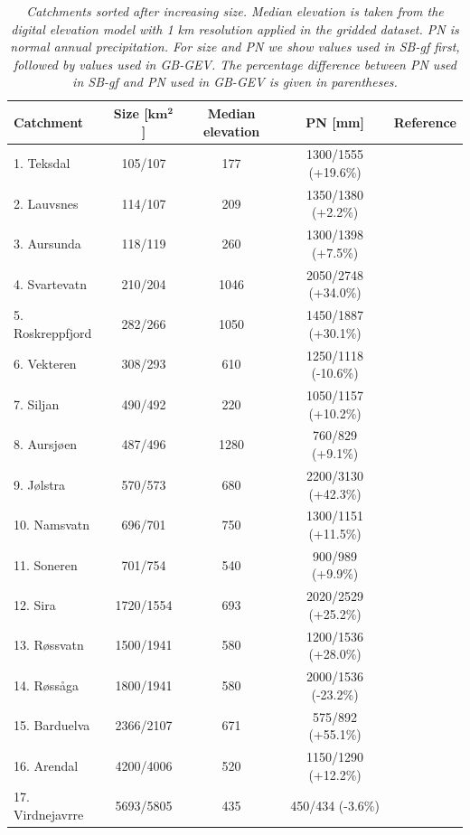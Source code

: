 \documentclass[12pt,a4paper,english]{article}
\begin{document}
\begin{table}[hbtp]
  \begin{tabular}{|l|c|c|c|c|}
    \hline
    \hline
    \textbf{Catchment} & \textbf{Size [$\mathbf{km^2}$] } & \textbf{Median elevation} & \textbf{PN [mm]} & \textbf{Reference} \\
	\hline
	1. Teksdal & 105/107 & 177 & 1300/1555 (+19.6\%) & \cite{Forland1997}\\
	\hline
	2. Lauvsnes & 114/107 & 209 & 1350/1380 (+2.2\%) & \cite{Isaksen2006}\\
	\hline
	3. Aursunda & 118/119 & 260 & 1300/1398 (+7.5\%) & \cite{Mamen2009}\\
	\hline
	4. Svartevatn & 210/204 & 1046 & 2050/2748 (+34.0\%) & \cite{Forland1991b} \\
	\hline
	5. Roskreppfjord & 282/266 & 1050 & 1450/1887 (+30.1\%) & \cite{Forland1991b}\\
	\hline
	6. Vekteren & 308/293 & 610 & 1250/1118 (-10.6\%) & \cite{Forland1991a}\\
	\hline
	7. Siljan & 490/492 & 220 & 1050/1157 (+10.2\%) & \cite{Forland1986b}\\
	\hline
	8. Aursj{\o}en & 487/496 & 1280 & 760/829 (+9.1\%) & \cite{Hanssen-Bauer1992}\\
	\hline
	9. J{\o}lstra & 570/573 & 680 & 2200/3130 (+42.3\%) & \cite{Forland1986a}\\
	\hline
	10. Namsvatn & 696/701 & 750 & 1300/1151 (+11.5\%) & \cite{Forland1991a}\\
	\hline
	11. Soneren & 701/754 & 540 & 900/989 (+9.9\%) & \cite{Hanssen-Bauer1991}\\
	\hline
	12. Sira & 1720/1554 & 693 & 2020/2529 (+25.2\%) & \cite{Forland1991b}\\
	\hline
	13. R{\o}ssvatn & 1500/1941 & 580 & 1200/1536 (+28.0\%) & \cite{Forland1988} \\
	\hline
	14. R{\o}ss{\aa}ga & 1800/1941 & 580 & 2000/1536 (-23.2\%) & \cite{Mamen2011b} \\
	\hline
	15. Barduelva & 2366/2107 & 671 & 575/892 (+55.1\%) & \cite{Forland1990b}\\
	\hline
	16. Arendal & 4200/4006 & 520 & 1150/1290 (+12.2\%) & \cite{Mamen2011a}\\
	\hline
	17. Virdnejavrre & 5693/5805 & 435 & 450/434 (-3.6\%) & \cite{Forland1994}\\
   \hline
   \hline
\end{tabular}
\caption[Areas]{\label{data:tab1}\sl Catchments sorted after increasing size. Median elevation is taken from the digital elevation model with 1 km resolution applied in the gridded dataset. PN is normal annual precipitation. For size and PN we show values used in SB-gf first, followed by values used in GB-GEV. The percentage difference between PN used in SB-gf and PN used in GB-GEV is given in parentheses.}
\end{table}
\end{document}
